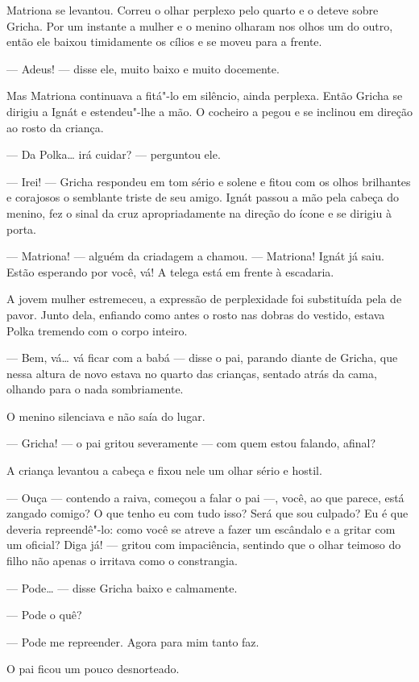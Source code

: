Matriona se levantou. Correu o olhar perplexo pelo quarto e o deteve
sobre Gricha. Por um instante a mulher e o menino olharam nos olhos um
do outro, então ele baixou timidamente os cílios e se moveu para a
frente.

--- Adeus! --- disse ele, muito baixo e muito docemente.

Mas Matriona continuava a fitá"-lo em silêncio, ainda perplexa. Então
Gricha se dirigiu a Ignát e estendeu"-lhe a mão. O cocheiro a pegou e se
inclinou em direção ao rosto da criança.

--- Da Polka\ldots{} irá cuidar? --- perguntou ele.

--- Irei! --- Gricha respondeu em tom sério e solene e fitou com os
olhos brilhantes e corajosos o semblante triste de seu amigo. Ignát
passou a mão pela cabeça do menino, fez o sinal da cruz apropriadamente
na direção do ícone e se dirigiu à porta.

--- Matriona! --- alguém da criadagem a chamou. --- Matriona! Ignát já
saiu. Estão esperando por você, vá! A telega está em frente à escadaria.

A jovem mulher estremeceu, a expressão de perplexidade foi substituída
pela de pavor. Junto dela, enfiando como antes o rosto nas dobras do
vestido, estava Polka tremendo com o corpo inteiro.

--- Bem, vá\ldots{} vá ficar com a babá --- disse o pai, parando diante de
Gricha, que nessa altura de novo estava no quarto das crianças, sentado
atrás da cama, olhando para o nada sombriamente.

O menino silenciava e não saía do lugar.

--- Gricha! --- o pai gritou severamente --- com quem estou falando,
afinal?

A criança levantou a cabeça e fixou nele um olhar sério e hostil.

--- Ouça --- contendo a raiva, começou a falar o pai ---, você, ao que
parece, está zangado comigo? O que tenho eu com tudo isso? Será que sou
culpado? Eu é que deveria repreendê"-lo: como você se atreve a fazer um
escândalo e a gritar com um oficial? Diga já! --- gritou com
impaciência, sentindo que o olhar teimoso do filho não apenas o
irritava como o constrangia.

--- Pode\ldots{} --- disse Gricha baixo e calmamente.

--- Pode o quê?

--- Pode me repreender. Agora para mim tanto faz.

O pai ficou um pouco desnorteado.

